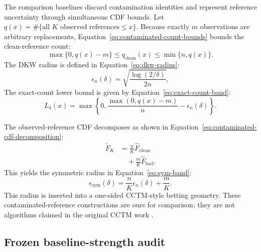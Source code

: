 The comparison baselines discard contamination identities and represent reference uncertainty through simultaneous CDF bounds. Let
\(q(x)=\#\{\text{all }K\text{ observed references}\le x\}.\)
Because exactly \(m\) observations are arbitrary replacements, Equation~\eqref{eq:contaminated-count-bounds} bounds the clean-reference count:
\begin{equation}
\max\{0,q(x)-m\}
  \le q_{\mathrm{clean}}(x)
  \le \min\{n,q(x)\}.
  \label{eq:contaminated-count-bounds}
\end{equation}
The DKW radius is defined in Equation~\eqref{eq:dkw-radius}:
\begin{equation}
\epsilon_n(\delta)
  =
  \sqrt{\frac{\log(2/\delta)}{2n}},
  \label{eq:dkw-radius}
\end{equation}
The exact-count lower bound is given by Equation~\eqref{eq:exact-count-band}:
\begin{equation}
  L_\delta(x)
  =
  \max\left\{
    0,
    \frac{\max(0,q(x)-m)}{n}
    -
    \epsilon_n(\delta)
  \right\}.
  \label{eq:exact-count-band}
\end{equation}

The observed-reference CDF decomposes as shown in Equation~\eqref{eq:contaminated-cdf-decomposition}:
\begin{equation}
\begin{aligned}
\widetilde F_K
&=\frac nK\widehat F_{\mathrm{clean}}\\
&\quad+\frac mK\widehat F_{\mathrm{bad}}.
\end{aligned}
\label{eq:contaminated-cdf-decomposition}
\end{equation}
This yields the symmetric radius in Equation~\eqref{eq:sym-band}:
\begin{equation}
  \epsilon_{\mathrm{sym}}(\delta)
  =
  \frac nK\epsilon_n(\delta)
  +
  \frac mK.
  \label{eq:sym-band}
\end{equation}
This radius is inserted into a one-sided CCTM-style betting geometry. These contaminated-reference constructions are ours for comparison; they are not algorithms claimed in the original CCTM work \cite{ShaerEtAl2026}.

\subsection{Frozen baseline-strength audit}

